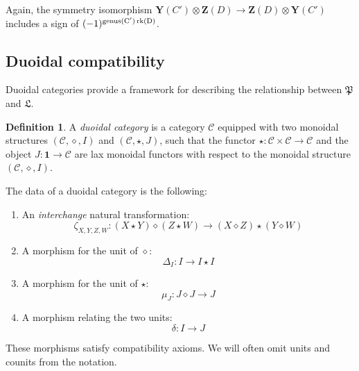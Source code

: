 \documentclass[11pt,letterpaper]{amsart}
\providecommand{\genus}{\ensuremath\mr{genus}}
\newcommand{\gY}{\mathbf{Y}}
\newcommand{\gZ}{\mathbf{Z}}
\newcommand{\PP}{\mathfrak{P}}
\newcommand{\LL}{\mathfrak{L}}
\numberwithin{theoremcounter}{section}
\theoremstyle{definition}
\newtheorem{definition}[Defauto]{Definition}
\theoremstyle{remark}
\newcommand{\mr}[1]{{\rm #1}}
\DeclareMathOperator{\rk}{rk}
\begin{document}
Again, the symmetry isomorphism $\gY(C') \otimes \gZ(D) \to \gZ(D) \otimes \gY(C')$ includes a sign of  $(-1)^{\genus(C')\rk(D)}$.

\subsection{Duoidal compatibility} \label{duoidal cat}

Duoidal categories provide a framework for describing the relationship between $\PP$ and $\LL$.

\begin{definition}
A \emph{duoidal category} is a category $\mathcal{C}$ equipped with two monoidal structures $(\mathcal{C}, \diamond, I)$ and $(\mathcal{C}, \star, J)$, such that the functor $\star \colon \mathcal{C} \times \mathcal{C} \to \mathcal{C}$ and the object $J \colon \mathbf{1} \to \mathcal{C}$ are lax monoidal functors with respect to the monoidal structure $(\mathcal{C}, \diamond, I)$.
\end{definition}


The data of a duoidal category is the following:
\begin{enumerate}
    \item An \emph{interchange} natural transformation:
    \[ \zeta_{X,Y,Z,W} \colon (X \star Y) \diamond (Z \star W) \longrightarrow (X \diamond Z) \star (Y \diamond W) \]
    
    \item A morphism for the unit of $\diamond$:
    \[ \Delta_I \colon I \longrightarrow I \star I \]
    
    \item A morphism for the unit of $\star$:
    \[ \mu_J \colon J \diamond J \longrightarrow J \]
    
    \item A morphism relating the two units:
    \[ \delta \colon I \longrightarrow J \]
\end{enumerate}


These morphisms satisfy compatibility axioms. We will often omit units and counits from the notation.
\end{document}
